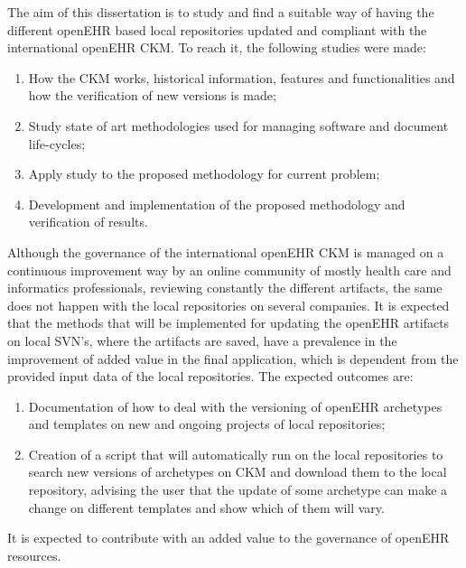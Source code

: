 \documentclass[mim_thesis.tex]{subfiles}
\begin{document}
The aim of this dissertation is to study and find a suitable way of having the different openEHR based local repositories updated and compliant with the international openEHR CKM. To reach it, the following studies were made:

\begin{enumerate}[noitemsep]
\item How the CKM works, historical information, features and functionalities and how the verification of new versions is made;
\item Study state of art methodologies used for managing software and document life-cycles;
\item Apply study to the proposed methodology for current problem;
\item Development and implementation of the proposed methodology and verification of results. 
\end{enumerate}

Although the governance of the international openEHR CKM is managed on a continuous improvement way by an online community of mostly health care and informatics professionals, reviewing constantly the different artifacts, the same does not happen with the local repositories on several companies. It is expected that the methods that will be implemented for updating the openEHR artifacts on local SVN’s, where the artifacts are saved, have a prevalence in the improvement of added value in the final application, which is dependent from the provided input data of the local repositories. The expected outcomes are:

\begin{enumerate}[noitemsep]
\item Documentation of how to deal with the versioning of openEHR archetypes and templates on new and ongoing projects of local repositories;
\item Creation of a script that will automatically run on the local repositories to search new versions of archetypes on CKM and download them to the local repository, advising the user that the update of some archetype can make a change on different templates and show which of them will vary.
\end{enumerate}

 It is expected to contribute with an added value to the governance of openEHR resources.
\end{document}
